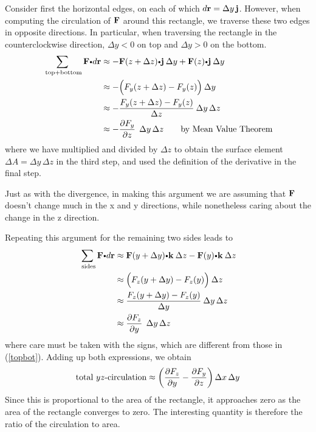 Consider first the horizontal edges, on each of which $d\mathbf{ r}=\Delta y\,\mathbf{ j}$. However, when computing the circulation of $\mathbf{ F}$ around this rectangle, we traverse these two edges in opposite directions. In particular, when traversing the rectangle in the counterclockwise direction, $\Delta y<0$ on top and $\Delta y>0$ on the bottom. 
\begin{align} \label{topbot} \sum_\text{ top+bottom}  \vector{F} \bp d\vector{r}   &\approx- \vector{F}(z+\Delta z)\bp\vector{j}\> \Delta y  + \vector{F}(z)\bp\vector{j}\> \Delta y \\
 &\approx - \Bigl( F_y(z+\Delta z) - F_y(z) \Bigr) \> \Delta y \nonumber\\
 &\approx - \dfrac{F_y(z+\Delta z) - F_y(z)}{\Delta z} \> \Delta y\,\Delta z \nonumber\\
 &\approx - \Dh{F_y}{z} \>\> \Delta y\,\Delta z \qquad \text{by Mean Value Theorem} \nonumber 
\end{align}
where we have multiplied and divided by $\Delta z$ to obtain the surface element $\Delta A=\Delta y\,\Delta z$ in the third step, and used the definition of the derivative in the final step.

Just as with the divergence, in making this argument we are assuming that $\mathbf{ F}$ doesn't change much in the x and y directions, while nonetheless caring about the change in the z direction. 

Repeating this argument for the remaining two sides leads to
\begin{eqnarray} \sum_\text{ sides}\vector{F} \bp d\vector{r}    &\approx   \vector{F}(y+\Delta y)\bp\vector{k}\> \Delta z  - \vector{F}(y)\bp\vector{k}\> \Delta z \\
 &\approx \Bigl( F_z(y+\Delta y) - F_z(y) \Bigr) \> \Delta z \nonumber\\
 &\approx \dfrac{F_z(y+\Delta y) - F_z(y)}{\Delta y} \> \Delta y\,\Delta z \nonumber\\
 &\approx \Dh{F_z}{y} \>\> \Delta y\,\Delta z \nonumber \end{eqnarray}
where care must be taken with the signs, which are different from those in (\ref{topbot}). Adding up both expressions, we obtain
\begin{equation} \hbox{total $yz$-circulation}   \approx\left( \frac{\partial F_z}{\partial y} - \frac{\partial F_y}{\partial z} \right) \Delta x\,\Delta y \end{equation}
Since this is proportional to the area of the rectangle, it approaches zero as the area of the rectangle converges to zero. The interesting quantity is therefore the ratio of the circulation to area. 



